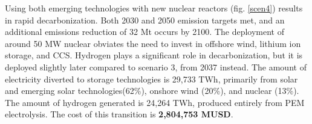 Using both emerging technologies with new nuclear reactors (fig. \ref{scen4}) results in rapid decarbonization. Both 2030 and 2050 emission targets met, and an additional emissions reduction of 32 Mt occurs by 2100. The deployment of around 50 MW nuclear obviates the need to invest in offshore wind, lithium ion storage, and \gls{CCS}. Hydrogen plays a significant role in decarbonization, but it is deployed slightly later compared to scenario 3, from 2037 instead. The amount of electricity diverted to storage technologies is 29,733 TWh, primarily from solar and emerging solar technologies(62\%), onshore wind (20\%), and nuclear (13\%). The amount of hydrogen generated is 24,264 TWh, produced entirely from PEM electrolysis. The cost of this transition is \textbf{2,804,753 MUSD}.

\begin{figure}[htb] 
\centering
\vspace*{-3cm}

\end{figure}
